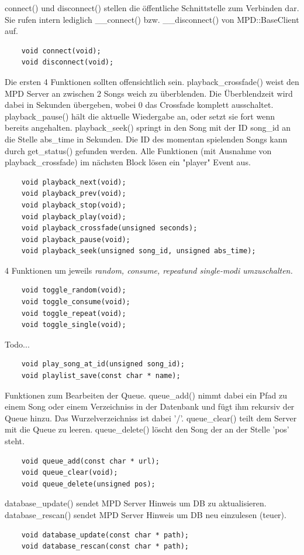 connect() und disconnect() stellen die öffentliche Schnittstelle zum Verbinden dar.
Sie rufen intern lediglich \_\_connect() bzw. \_\_disconnect() von MPD::BaseClient auf.
\begin{verbatim}
    void connect(void);
    void disconnect(void);
\end{verbatim}

Die ersten 4 Funktionen sollten offensichtlich sein.
playback\_crossfade() weist den MPD Server an zwischen 2 Songs weich zu überblenden. Die Überblendzeit wird
dabei in Sekunden übergeben, wobei 0 das Crossfade komplett ausschaltet.
playback\_pause() hält die aktuelle Wiedergabe an, oder setzt sie fort wenn bereits angehalten.
playback\_seek() springt in den Song mit der ID song\_id an die Stelle abs\_time in Sekunden.
Die ID des momentan spielenden Songs kann durch get\_status() gefunden werden.
Alle Funktionen (mit Ausnahme von playback\_crossfade) im nächsten Block lösen ein "player" Event aus.
\begin{verbatim}
    void playback_next(void);
    void playback_prev(void);
    void playback_stop(void);
    void playback_play(void);
    void playback_crossfade(unsigned seconds);    
    void playback_pause(void);
    void playback_seek(unsigned song_id, unsigned abs_time);
\end{verbatim}

4 Funktionen um jeweils \it random, consume, repeat\rm und \textit{single}-modi umzuschalten.
\begin{verbatim}
    void toggle_random(void);
    void toggle_consume(void);
    void toggle_repeat(void);
    void toggle_single(void);
\end{verbatim}

Todo...
\begin{verbatim}
    void play_song_at_id(unsigned song_id);
    void playlist_save(const char * name);
\end{verbatim}   

Funktionen zum Bearbeiten der Queue. queue\_add() nimmt dabei ein Pfad zu einem Song oder einem Verzeichniss in der Datenbank 
und fügt ihm rekursiv der Queue hinzu. Das Wurzelverzeichniss ist dabei '/'.
queue\_clear() teilt dem Server mit die Queue zu leeren.
queue\_delete() löscht den Song der an der Stelle 'pos' steht. 
\begin{verbatim}
    void queue_add(const char * url);
    void queue_clear(void);
    void queue_delete(unsigned pos);
\end{verbatim}

database\_update() sendet MPD Server Hinweis um DB zu aktualisieren.
database\_rescan() sendet MPD Server Hinweis um DB neu einzulesen (teuer).
\begin{verbatim}
    void database_update(const char * path);
    void database_rescan(const char * path);
\end{verbatim}

